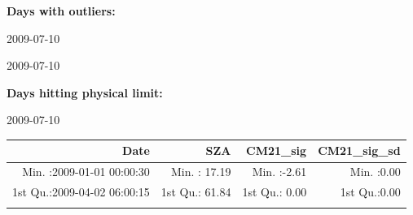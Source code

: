 \documentclass[
  10pt,
  a4paper,oneside]{article}
\begin{document}
\normalsize

\textbf{Days with outliers:}

2009-07-10

2009-07-10

\textbf{Days hitting physical limit:}

2009-07-10

\footnotesize

\begin{longtable}[]{@{}rrrr@{}}
\toprule
\begin{minipage}[b]{0.34\columnwidth}\raggedleft
Date\strut
\end{minipage} & \begin{minipage}[b]{0.19\columnwidth}\raggedleft
SZA\strut
\end{minipage} & \begin{minipage}[b]{0.18\columnwidth}\raggedleft
CM21\_sig\strut
\end{minipage} & \begin{minipage}[b]{0.18\columnwidth}\raggedleft
CM21\_sig\_sd\strut
\end{minipage}\tabularnewline
\midrule
\endhead
\begin{minipage}[t]{0.34\columnwidth}\raggedleft
Min. :2009-01-01 00:00:30\strut
\end{minipage} & \begin{minipage}[t]{0.19\columnwidth}\raggedleft
Min. : 17.19\strut
\end{minipage} & \begin{minipage}[t]{0.18\columnwidth}\raggedleft
Min. :-2.61\strut
\end{minipage} & \begin{minipage}[t]{0.18\columnwidth}\raggedleft
Min. :0.00\strut
\end{minipage}\tabularnewline
\begin{minipage}[t]{0.34\columnwidth}\raggedleft
1st Qu.:2009-04-02 06:00:15\strut
\end{minipage} & \begin{minipage}[t]{0.19\columnwidth}\raggedleft
1st Qu.: 61.84\strut
\end{minipage} & \begin{minipage}[t]{0.18\columnwidth}\raggedleft
1st Qu.: 0.00\strut
\end{minipage} & \begin{minipage}[t]{0.18\columnwidth}\raggedleft
1st Qu.:0.00\strut
\end{minipage}\tabularnewline
\begin{minipage}[t]{0.34\columnwidth}\raggedleft

\end{minipage}
\end{longtable}
\end{document}
